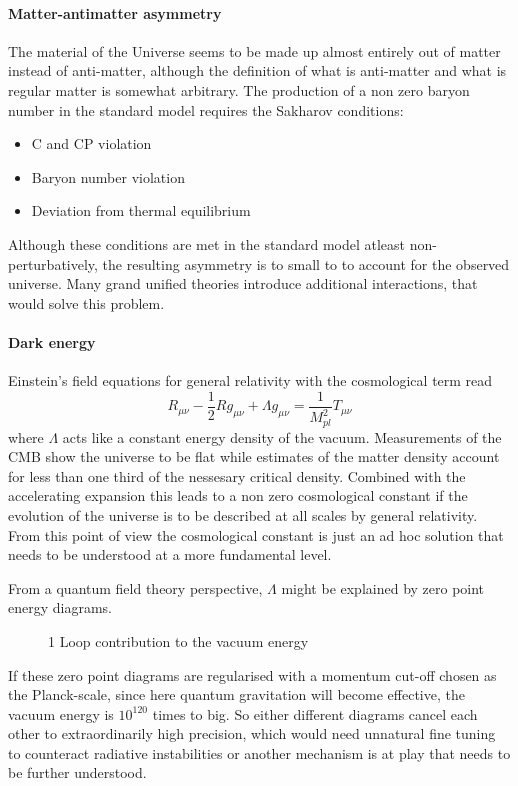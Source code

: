 \paragraph{Matter-antimatter asymmetry}
The material of the Universe seems to be made up almost entirely out of matter instead of anti-matter, although the definition of what is anti-matter and what is regular matter is somewhat arbitrary.  The production of a non zero baryon number in the standard model requires the Sakharov conditions:
\begin{itemize}
\item C and CP violation
\item Baryon number violation
\item Deviation from thermal equilibrium
\end{itemize}
Although these conditions are met in the standard model atleast non-perturbatively, the resulting asymmetry is to small to to account for the observed universe. Many grand unified theories introduce additional interactions, that would solve this problem.

\paragraph{Dark energy}
Einstein's field equations for general relativity with the cosmological term read 
\begin{equation}
R_{\mu\nu}-\frac{1}{2}Rg_{\mu\nu}+\Lambda 
g_{\mu\nu}= \frac{1}{M_{pl}^2}T_{\mu\nu}
\end{equation}
where $\Lambda$ acts like a constant energy density of the vacuum. 
Measurements of the CMB show the universe to be flat while estimates of the matter density account for less than one third of the nessesary critical density\cite{Mortonson:2013zfa}. Combined with the accelerating expansion this leads to a non zero cosmological constant if the evolution of the universe is to be described at all scales by general relativity.
From this point of view the cosmological constant is just an ad hoc solution that needs to be understood at a more fundamental level.


From a quantum field theory perspective, $\Lambda$ might be explained by zero point energy diagrams. 
\begin{figure}[H]
\centering
{}
\caption{1 Loop contribution to the vacuum energy}
\label{fg:ZeroPoint}
\end{figure}
If these zero point diagrams are regularised with a momentum cut-off chosen as the Planck-scale, since here quantum gravitation will become effective, the vacuum energy is $10^{120}$ times to big. So either different diagrams cancel each other to extraordinarily high precision, which would need unnatural fine tuning to counteract radiative instabilities or another mechanism is at play that needs to be further understood.


